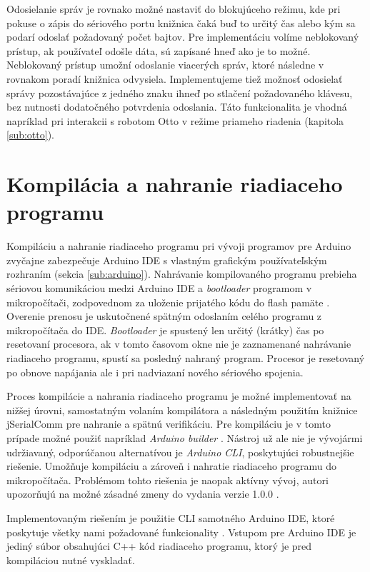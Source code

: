 Odosielanie správ je rovnako možné nastaviť do blokujúceho režimu, kde pri pokuse o zápis do sériového portu knižnica čaká buď to určitý čas alebo kým sa podarí odoslať požadovaný počet bajtov. Pre implementáciu volíme neblokovaný prístup, ak používateľ odošle dáta, sú zapísané hneď ako je to možné. Neblokovaný prístup umožní odoslanie viacerých správ, ktoré následne v rovnakom poradí knižnica odvysiela. Implementujeme tiež možnosť odosielať správy pozostávajúce z jedného znaku ihneď po stlačení požadovaného klávesu, bez nutnosti dodatočného potvrdenia odoslania. Táto funkcionalita je vhodná napríklad pri interakcii s robotom Otto v režime priameho riadenia (kapitola \ref{sub:otto}).


\section{Kompilácia a nahranie riadiaceho programu}
\label{sub:arduinoIDE}
Kompiláciu a nahranie riadiaceho programu pri vývoji programov pre Arduino zvyčajne zabezpečuje Arduino IDE s vlastným grafickým používateľským rozhraním (sekcia \ref{sub:arduino}). Nahrávanie kompilovaného programu prebieha sériovou komunikáciou medzi Arduino IDE a \textit{bootloader} programom v mikropočítači, zodpovednom za uloženie prijatého kódu do flash pamäte \cite{sketchUpload}. Overenie prenosu je uskutočnené spätným odoslaním celého programu z mikropočítača do IDE. \textit{Bootloader} je spustený len určitý (krátky) čas po resetovaní procesora, ak v tomto časovom okne nie je zaznamenané nahrávanie riadiaceho programu, spustí sa posledný nahraný program. Procesor je resetovaný po obnove napájania ale i pri nadviazaní nového sériového spojenia.

Proces kompilácie a nahrania riadiaceho programu je možné implementovať na nižšej úrovni, samostatným volaním kompilátora a následným použitím knižnice jSerialComm pre nahranie a spätnú verifikáciu. Pre kompiláciu je v tomto prípade možné použiť napríklad \textit{Arduino builder} \cite{arduinoBuilder}. Nástroj už ale nie je vývojármi udržiavaný, odporúčanou alternatívou je \textit{Arduino CLI}, poskytujúci robustnejšie riešenie. Umožňuje kompiláciu a zároveň i nahratie riadiaceho programu do mikropočítača. Problémom tohto riešenia je naopak aktívny vývoj, autori upozorňujú na možné zásadné zmeny do vydania verzie 1.0.0 \cite{arduinoCli}.

Implementovaným riešením je použitie CLI samotného Arduino IDE, ktoré poskytuje všetky nami požadované funkcionality \cite{arduinoIdeCli}. Vstupom pre Arduino IDE je jediný súbor obsahujúci C++ kód riadiaceho programu, ktorý je pred kompiláciou nutné vyskladať.

